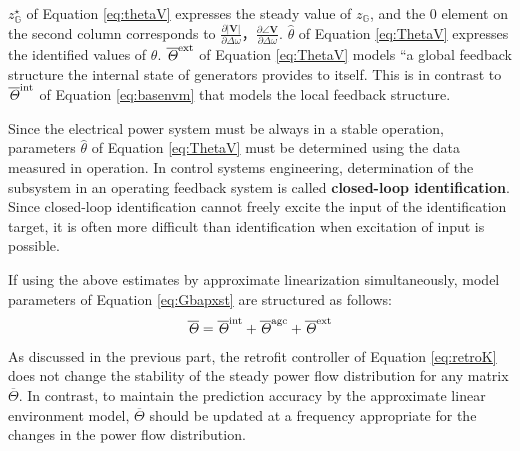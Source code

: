 \documentclass[tombow,dvipdfmx]{corona-a5-1.1}
\begin{document}
$z_{\mathds G}^{\star}$ of Equation \ref{eq:thetaV} expresses the steady value of $z_{\mathds G}$, and the 0 element on the second column corresponds to $\tfrac{\partial |\bm{V}| }{\partial \Delta \omega}$，$\tfrac{\partial \angle \bm{V} }{\partial \Delta \omega}$.
$\hat{\theta}$ of Equation \ref{eq:ThetaV} expresses the identified values of $\theta$.
$\overline{\mathit{\Theta}}^{\rm ext}$ of Equation \ref{eq:ThetaV} models “a global feedback structure the internal state of generators provides to itself.
This is in contrast to $\overline{\mathit{\Theta}}^{\rm int}$ of Equation \ref{eq:basenvm} that models the local feedback structure.

Since the electrical power system must be always in a stable operation, parameters $\hat{\theta}$ of Equation \ref{eq:ThetaV} must be determined using the data measured in operation.
In control systems engineering, determination of the subsystem in an operating feedback system is called \textbf{closed-loop identification}.
Since closed-loop identification cannot freely excite the input of the identification target, it is often more difficult than identification when excitation of input is possible.

If using the above estimates by approximate linearization simultaneously, model parameters of Equation \ref{eq:Gbapxst} are structured as follows:
\begin{align}\label{eq:Thetasum}
\overline{\mathit{\Theta}}=
\overline{\mathit{\Theta}}^{\rm int}+
\overline{\mathit{\Theta}}^{\rm agc}+
\overline{\mathit{\Theta}}^{\rm ext}
\end{align}
As discussed in the previous part, the retrofit controller of Equation \ref{eq:retroK} does not change the stability of the steady power flow distribution for any matrix $\overline{\mathit{\Theta}}$.
In contrast, to maintain the prediction accuracy by the approximate linear environment model, $\overline{\mathit{\Theta}}$ should be updated at a frequency appropriate for the changes in the power flow distribution.
\end{document}
